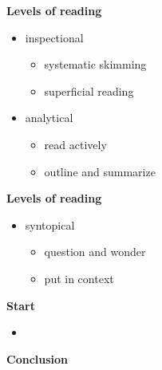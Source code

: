 \begin{frame}

\textbf{Levels of reading}\vspace{0.5cm}
\begin{itemize}\setlength\itemsep{1em}
  \item inspectional\medskip
  \begin{itemize}\setlength\itemsep{1em}
  \item systematic skimming
  \item superficial reading
  \end{itemize}
  \item analytical\medskip
  \begin{itemize}\setlength\itemsep{1em}
  \item read actively
  \item outline and summarize
  \end{itemize}
\end{itemize}

\end{frame}
\begin{frame}

\textbf{Levels of reading}\vspace{0.5cm}
\begin{itemize}\setlength\itemsep{1em}
  \item syntopical\medskip
  \begin{itemize}\setlength\itemsep{1em}
  \item question and wonder
  \item put in context
  \end{itemize}
\end{itemize}

\end{frame}
\begin{frame}\textbf{Start}\vspace{0.5cm}

\begin{itemize}\setlength\itemsep{1em}
\item {}
\end{itemize}

\end{frame}
\begin{frame}\begin{center}
\LARGE\textbf{Conclusion}
\end{center}\end{frame}
